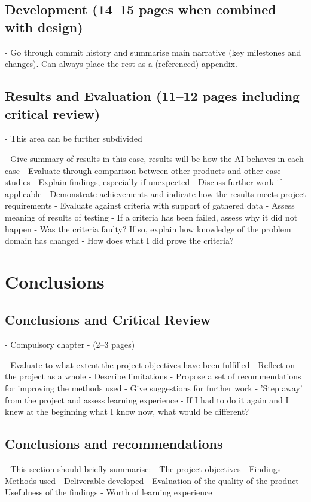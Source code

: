 \documentclass[11pt, a4paper]{article}
\begin{document}
\subsection {Development (14--15 pages when combined with design)}
\label{subsec:development}

- Go through commit history and summarise main narrative (key milestones and changes). Can always place the rest as a (referenced) appendix.

\subsection {Results and Evaluation (11--12 pages including critical review)}
\label{subsec:resultsAndEvaluation}

- This area can be further subdivided

- Give summary of results in this case, results will be how the AI behaves in each case
  - Evaluate through comparison between other products and other case studies
  - Explain findings, especially if unexpected
 - Discuss further work if applicable
- Demonstrate achievements and indicate how the results meets project requirements
  - Evaluate against criteria with support of gathered data
  - Assess meaning of results of testing 
    - If a criteria has been failed, assess why it did not happen 
      - Was the criteria faulty? If so, explain how knowledge of the problem domain has changed
    - How does what I did prove the criteria?

\section {Conclusions}
\label{sec:conclusions}

\subsection {Conclusions and Critical Review}
\label{subsec:conclusionsAndCriticalReview}

- Compulsory chapter
- (2--3 pages)

- Evaluate to what extent the project objectives have been fulfilled 
- Reflect on the project as a whole 
- Describe limitations 
  - Propose a set of recommendations for improving the methods used
  - Give suggestions for further work
- 'Step away' from the project and assess learning experience
  - If I had to do it again and I knew at the beginning what I know now, what would be different?

\subsection{Conclusions and recommendations}
\label{subsec:conclusionsAndRecommendations}

- This section should briefly summarise:
  - The project objectives
  - Findings
  - Methods used 
  - Deliverable developed
  - Evaluation of the quality of the product
  - Usefulness of the findings
  - Worth of learning experience

\printbibliography[
  heading=bibintoc,
  title={Bibliography}
]
\end{document}
